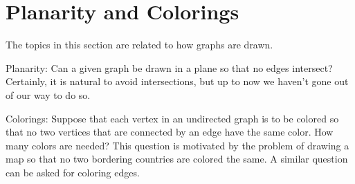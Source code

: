 \documentclass[10pt,]{book}
\theoremstyle{plain}
\theoremstyle{definition}
\theoremstyle{definition}
\theoremstyle{definition}
\theoremstyle{definition}
\theoremstyle{definition}
\numberwithin{equation}{section}
\begin{document}
\section[Planarity and Colorings]{Planarity and Colorings}\label{s-planarity-and-colorings}
\typeout{************************************************}
\typeout{************************************************}
The topics in this section are related to how graphs are drawn.%
\par
Planarity: Can a given graph be drawn in a plane so that no edges intersect? Certainly, it is natural to avoid intersections, but up to now we haven't gone out of our way to do so.%
\par
Colorings: Suppose that each vertex in an undirected graph is to be colored so that no two vertices that are connected by an edge have the
same color. How many colors are needed? This question is motivated by the problem of drawing a map so that no two bordering countries are colored
the same. A similar question can be asked for coloring edges.%
\typeout{************************************************}
\typeout{************************************************}
\end{document}
